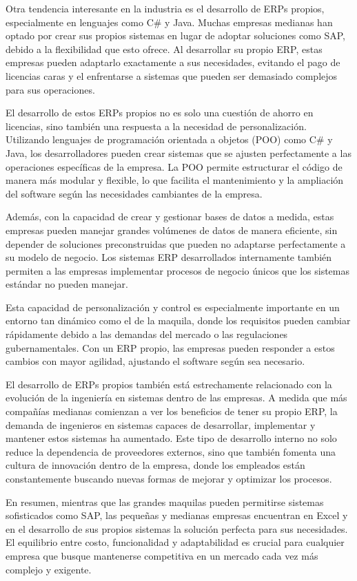 \documentclass[
  letterpaper,
]{book}
\begin{document}
Otra tendencia interesante en la industria es el desarrollo de ERPs
propios, especialmente en lenguajes como C\# y Java. Muchas empresas
medianas han optado por crear sus propios sistemas en lugar de adoptar
soluciones como SAP, debido a la flexibilidad que esto ofrece. Al
desarrollar su propio ERP, estas empresas pueden adaptarlo exactamente a
sus necesidades, evitando el pago de licencias caras y el enfrentarse a
sistemas que pueden ser demasiado complejos para sus operaciones.

El desarrollo de estos ERPs propios no es solo una cuestión de ahorro en
licencias, sino también una respuesta a la necesidad de personalización.
Utilizando lenguajes de programación orientada a objetos (POO) como C\#
y Java, los desarrolladores pueden crear sistemas que se ajusten
perfectamente a las operaciones específicas de la empresa. La POO
permite estructurar el código de manera más modular y flexible, lo que
facilita el mantenimiento y la ampliación del software según las
necesidades cambiantes de la empresa.

Además, con la capacidad de crear y gestionar bases de datos a medida,
estas empresas pueden manejar grandes volúmenes de datos de manera
eficiente, sin depender de soluciones preconstruidas que pueden no
adaptarse perfectamente a su modelo de negocio. Los sistemas ERP
desarrollados internamente también permiten a las empresas implementar
procesos de negocio únicos que los sistemas estándar no pueden manejar.

Esta capacidad de personalización y control es especialmente importante
en un entorno tan dinámico como el de la maquila, donde los requisitos
pueden cambiar rápidamente debido a las demandas del mercado o las
regulaciones gubernamentales. Con un ERP propio, las empresas pueden
responder a estos cambios con mayor agilidad, ajustando el software
según sea necesario.

El desarrollo de ERPs propios también está estrechamente relacionado con
la evolución de la ingeniería en sistemas dentro de las empresas. A
medida que más compañías medianas comienzan a ver los beneficios de
tener su propio ERP, la demanda de ingenieros en sistemas capaces de
desarrollar, implementar y mantener estos sistemas ha aumentado. Este
tipo de desarrollo interno no solo reduce la dependencia de proveedores
externos, sino que también fomenta una cultura de innovación dentro de
la empresa, donde los empleados están constantemente buscando nuevas
formas de mejorar y optimizar los procesos.

En resumen, mientras que las grandes maquilas pueden permitirse sistemas
sofisticados como SAP, las pequeñas y medianas empresas encuentran en
Excel y en el desarrollo de sus propios sistemas la solución perfecta
para sus necesidades. El equilibrio entre costo, funcionalidad y
adaptabilidad es crucial para cualquier empresa que busque mantenerse
competitiva en un mercado cada vez más complejo y exigente.
\end{document}
